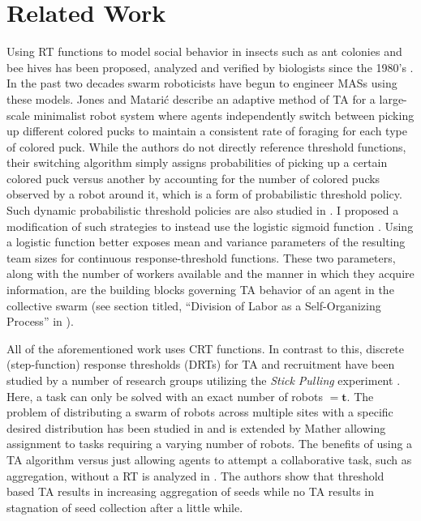 \documentclass[defaultstyle,12pt]{proposal}
\newcommand{\td}{\mathbf{t}}
\begin{document}
\section{Related Work}\label{sec:relwork}
Using RT functions to model social behavior in insects such as ant colonies \cite{Bonabeau1996, Bonabeau1997} and bee hives \cite{Robinson1987, Robinson1992, PageJr1990} has been proposed, analyzed and verified by biologists since the 1980's \cite{Theraulaz1998}. In the past two decades swarm roboticists have begun to engineer MASs using these models. Jones and Matari\'c \cite{Jones2004} describe an adaptive method of TA for a large-scale minimalist robot system where agents independently switch between picking up different colored pucks to maintain a consistent rate of foraging for each type of colored puck. While the authors do not directly reference threshold functions, their switching algorithm simply assigns probabilities of picking up a certain colored puck versus another by accounting for the number of colored pucks observed by a robot around it, which is a form of probabilistic threshold policy. Such dynamic probabilistic threshold policies are also studied in \cite{Nouyan2002}. I proposed a modification of such strategies to instead use the logistic sigmoid function \cite{Kanakia2014}. Using a logistic function better exposes mean and variance parameters of the resulting team sizes for continuous response-threshold functions. These two parameters, along with the number of workers available and the manner in which they acquire information, are the building blocks governing TA behavior of an agent in the collective swarm (see section titled, ``Division of Labor as a Self-Organizing Process'' in \cite{Robinson1992}).

All of the aforementioned work uses CRT functions. In contrast to this, discrete (step-function) response thresholds (DRTs) for TA and recruitment have been studied by a number of research groups utilizing the \emph{Stick Pulling} experiment \cite{Martinoli1995, Martinoli1998, Lerman2001, Martinoli2004}. Here, a task can only be solved with an exact number of robots $= \td$. The problem of distributing a swarm of robots across multiple sites with a specific desired distribution has been studied in \cite{Berman2009, Correll2008} and is extended by Mather \cite{Mather2010} allowing assignment to tasks requiring a varying number of robots. The benefits of using a TA algorithm versus just allowing agents to attempt a collaborative task, such as aggregation, without a RT is analyzed in \cite{Agassounon2001}. The authors show that threshold based TA results in increasing aggregation of seeds while no TA results in stagnation of seed collection after a little while. 
\end{document}
